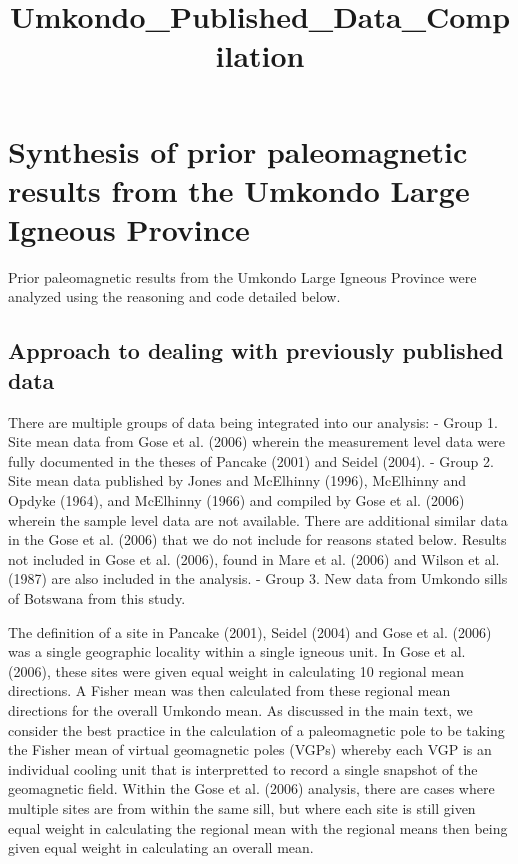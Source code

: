\documentclass{article}
\title{Umkondo\_Published\_Data\_Compilation}
\begin{document}
    
    
    \maketitle
    
    

    
    \section{Synthesis of prior paleomagnetic results from the Umkondo Large
Igneous
Province}\label{synthesis-of-prior-paleomagnetic-results-from-the-umkondo-large-igneous-province}

    Prior paleomagnetic results from the Umkondo Large Igneous Province were
analyzed using the reasoning and code detailed below.

    \subsection{Approach to dealing with previously published
data}\label{approach-to-dealing-with-previously-published-data}

    There are multiple groups of data being integrated into our analysis: -
Group 1. Site mean data from Gose et al. (2006) wherein the measurement
level data were fully documented in the theses of Pancake (2001) and
Seidel (2004). - Group 2. Site mean data published by Jones and
McElhinny (1996), McElhinny and Opdyke (1964), and McElhinny (1966) and
compiled by Gose et al. (2006) wherein the sample level data are not
available. There are additional similar data in the Gose et al. (2006)
that we do not include for reasons stated below. Results not included in
Gose et al. (2006), found in Mare et al. (2006) and Wilson et al. (1987)
are also included in the analysis. - Group 3. New data from Umkondo
sills of Botswana from this study.

The definition of a site in Pancake (2001), Seidel (2004) and Gose et
al. (2006) was a single geographic locality within a single igneous
unit. In Gose et al. (2006), these sites were given equal weight in
calculating 10 regional mean directions. A Fisher mean was then
calculated from these regional mean directions for the overall Umkondo
mean. As discussed in the main text, we consider the best practice in
the calculation of a paleomagnetic pole to be taking the Fisher mean of
virtual geomagnetic poles (VGPs) whereby each VGP is an individual
cooling unit that is interpretted to record a single snapshot of the
geomagnetic field. Within the Gose et al. (2006) analysis, there are
cases where multiple sites are from within the same sill, but where each
site is still given equal weight in calculating the regional mean with
the regional means then being given equal weight in calculating an
overall mean.
\end{document}

